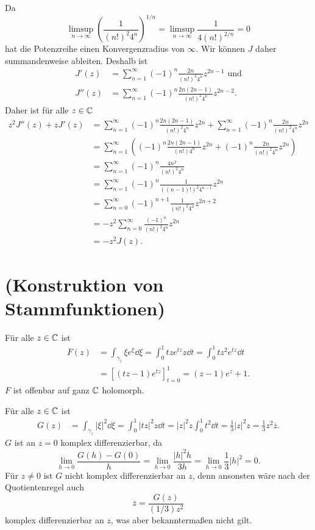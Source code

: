 \documentclass[a4paper,10pt]{article}
\begin{document}
Da
\[
 \limsup_{n \to \infty} \left( \frac{1}{(n!)^2 4^n} \right)^{1/n} = \limsup_{n \to \infty} \frac{1}{4 (n!)^{2/n}} = 0
\]
hat die Potenzreihe einen Konvergenzradius von $\infty$. Wir können $J$ daher summandenweise ableiten. Deshalb ist
\begin{align*}
  J'(z) &= \sum_{n=1}^\infty (-1)^n \frac{2n}{(n!)^2 4^n}{z^{2n-1}} \text{ und} \\
 J''(z) &= \sum_{n=1}^\infty (-1)^n \frac{2n (2n-1)}{(n!)^2 4^n} z^{2n-2}.
\end{align*}
Daher ist für alle $z \in \mathbb{C}$
\begin{align*}
 z^2 J''(z) + z J'(z)
 &= \sum_{n=1}^\infty (-1)^n \frac{2n(2n-1)}{(n!)^2 4^n} z^{2n} + \sum_{n=1}^\infty (-1)^n \frac{2n}{(n!)^2 4^n} z^{2n} \\
 &= \sum_{n=1}^\infty \left( (-1)^n \frac{2n(2n-1)}{(n!)4^n} z^{2n} + (-1)^n \frac{2n}{(n!)^2 4^n} z^{2n} \right) \\
 &= \sum_{n=1}^\infty (-1)^n \frac{4n^2}{(n!)^2 4^n} \\
 &= \sum_{n=1}^\infty (-1)^n \frac{1}{((n-1)!)^2 4^{n-1}} z^{2n} \\
 &= \sum_{n=0}^\infty (-1)^{n+1} \frac{1}{(n!)^2 4^n} z^{2n+2} \\
 &= -z^2 \sum_{n=0}^\infty \frac{(-1)^n}{(n!)^2 4^n} z^{2n} \\
 &= -z^2 J(z).
\end{align*}





\section{(Konstruktion von Stammfunktionen)}
Für alle $z \in \mathbb{C}$ ist
\begin{align*}
 F(z)
 &= \int_{\gamma_z} \xi e^{\xi} \dd{\xi}
 = \int_0^1 tz e^{tz} z \dd{t}
 = \int_0^1 t z^2 e^{tz} \dd{t} \\
 &= \left[ (tz-1) e^{tz} \right]_{t=0}^1
 = (z-1)e^z + 1.
\end{align*}
$F$ ist offenbar auf ganz $\mathbb{C}$ holomorph.

Für alle $z \in \mathbb{C}$ ist
\begin{align*}
 G(z)
 &= \int_{\gamma_z} |\xi|^2 \dd{\xi}
 = \int_0^1 |tz|^2 z \dd{t}
 = |z|^2 z \int_0^1 t^2 \dd{t}
 = \frac{1}{3} |z|^2 z
 = \frac{1}{3} z^2 \overline{z}.
\end{align*}
$G$ ist an $z = 0$ komplex differenzierbar, da
\[
 \lim_{h \to 0} \frac{G(h)-G(0)}{h}
 = \lim_{h \to 0} \frac{|h|^2 h}{3h}
 = \lim_{h \to 0} \frac{1}{3} |h|^2
 = 0.
\]
Für $z \neq 0$ ist $G$ nicht komplex differenzierbar an $z$, denn ansonsten wäre nach der Quotientenregel auch
\[
 \overline{z} = \frac{G(z)}{(1/3)z^2}
\]
komplex differenzierbar an $z$, was aber bekanntermaßen nicht gilt.
\end{document}

